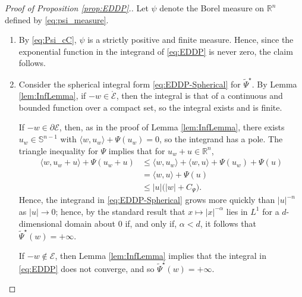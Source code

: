 \documentclass[reqno]{amsart}
\theoremstyle{definition}
\begin{document}
\begin{proof}[Proof of Proposition \ref{prop:EDDP}.]
	\label{pf:thm:EDDP}
	Let $\psi$ denote the Borel measure on ${\mathbb{R}}^{n}$ defined by \eqref{eq:psi_measure}.
	\begin{enumerate}
		\item By \eqref{eq:Psi_cC}, $\psi$ is a strictly positive and finite measure.  Hence, since the exponential function in the integrand of \eqref{eq:EDDP} is never zero, the claim follows.
	
		\item Consider the spherical integral form \eqref{eq:EDDP-Spherical} for ${\widetilde{\Psi}}^{\star}$. 	By Lemma \ref{lem:InfLemma}, if $- w \in \mathring{\mathcal{E}}$, then the integral is that of a continuous and bounded function over a compact set, so the integral exists and is finite.
	
		If $- w \in \partial {\mathcal{E}}$, then, as in the proof of Lemma \ref{lem:InfLemma}, there exists $u_{w} \in \mathbb{S}^{n - 1}$ with $\langle w, u_{w} \rangle + \Psi(u_{w}) = 0$, so the integrand has a pole.  The triangle inequality for $\Psi$ implies that for $u_{w} + u \in {\mathbb{R}}^{n}$,
		\begin{align*}
			\langle w, u_{w} + u \rangle + \Psi(u_{w} + u)
			& \leq \langle w, u_{w} \rangle + \langle w, u \rangle + \Psi(u_{w}) + \Psi(u) \\
			& = \langle w, u \rangle + \Psi(u) \\
			& \leq | u | \big( | w | + C_{\Psi} \big).
		\end{align*}
		Hence, the integrand in \eqref{eq:EDDP-Spherical} grows more quickly than $|u|^{-n}$ as $|u| \to 0$;  hence, by the standard result that $x \mapsto | x |^{- \alpha}$ lies in $L^{1}$ for a $d$-dimensional domain about $0$ if, and only if, $\alpha < d$, it follows that ${\widetilde{\Psi}}^{\star} (w) = + \infty$.
	
		If $- w \not \in {\mathcal{E}}$, then Lemma \ref{lem:InfLemma} implies that the integral in \eqref{eq:EDDP} does not converge, and so ${\widetilde{\Psi}}^{\star} (w) = + \infty$.


\end{enumerate}
\end{proof}
\end{document}
